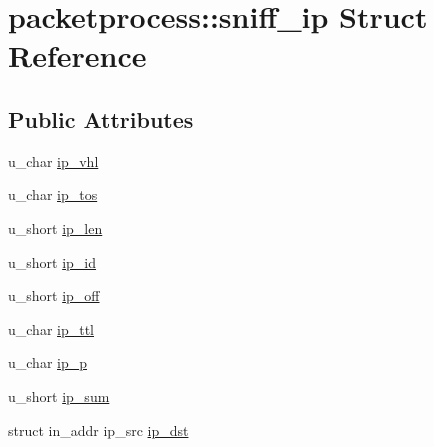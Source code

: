\hypertarget{structpacketprocess_1_1sniff__ip}{\section{packetprocess\-:\-:sniff\-\_\-ip Struct Reference}
\label{structpacketprocess_1_1sniff__ip}
}
\subsection*{Public Attributes}
\begin{DoxyCompactItemize}
\item 
u\-\_\-char \hyperlink{structpacketprocess_1_1sniff__ip_a58f9c8e74a6204cd38bb6e404c2338c5}{ip\-\_\-vhl}
\item 
u\-\_\-char \hyperlink{structpacketprocess_1_1sniff__ip_a106bc8a251b55cdd13934bfed4785ae6}{ip\-\_\-tos}
\item 
u\-\_\-short \hyperlink{structpacketprocess_1_1sniff__ip_a98befd872cec3609b97989647cf5f9fd}{ip\-\_\-len}
\item 
u\-\_\-short \hyperlink{structpacketprocess_1_1sniff__ip_aa756a51f634dc93175521ea1d58ed36c}{ip\-\_\-id}
\item 
u\-\_\-short \hyperlink{structpacketprocess_1_1sniff__ip_a63728e3756b9d6736049dbed1b189275}{ip\-\_\-off}
\item 
u\-\_\-char \hyperlink{structpacketprocess_1_1sniff__ip_adcc8fd2d0bc337b78d7956e150bd5d89}{ip\-\_\-ttl}
\item 
u\-\_\-char \hyperlink{structpacketprocess_1_1sniff__ip_a98e71ce9ec87082492b4bf2622903ae3}{ip\-\_\-p}
\item 
u\-\_\-short \hyperlink{structpacketprocess_1_1sniff__ip_a596850a71ac22e40f393d5ea7d456b1e}{ip\-\_\-sum}
\item 
struct in\-\_\-addr ip\-\_\-src \hyperlink{structpacketprocess_1_1sniff__ip_ac400f30b4020540644d08fedaa2349f2}{ip\-\_\-dst}
\end{DoxyCompactItemize}



